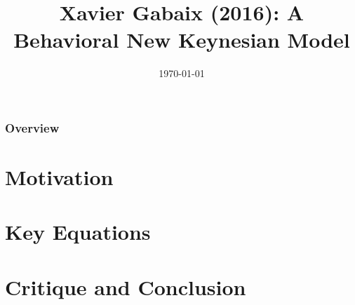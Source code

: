 \documentclass{beamer}
\title[A Behavioral New Keynesian Model]{Xavier Gabaix (2016): A Behavioral New Keynesian Model} %
\author{} %
\institute[] %
{
\\Carlos Montoya, Patrick Molligo and Clemens Stiewe %
\medskip
\textit{} %
}
\date{\today} %
\begin{document}
\begin{frame}
\titlepage %
\end{frame}


\begin{frame}
\frametitle{Overview} %
\tableofcontents %
\end{frame}


\section{Motivation} %
\section{Key Equations}
\section{Critique and Conclusion}


\end{document}
